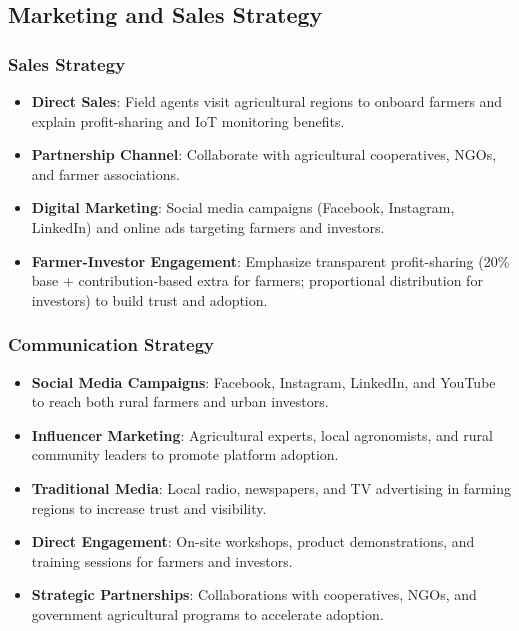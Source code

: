 \documentclass[9pt,twocolumn,twoside]{article}
\begin{document}
\subsection{Marketing and Sales Strategy}

\subsubsection{Sales Strategy}

\begin{itemize}
  \item \textbf{Direct Sales}: Field agents visit agricultural regions to onboard farmers and explain profit-sharing and IoT monitoring benefits.
  \item \textbf{Partnership Channel}: Collaborate with agricultural cooperatives, NGOs, and farmer associations.
  \item \textbf{Digital Marketing}: Social media campaigns (Facebook, Instagram, LinkedIn) and online ads targeting farmers and investors.
  \item \textbf{Farmer-Investor Engagement}: Emphasize transparent profit-sharing (20\% base + contribution-based extra for farmers; proportional distribution for investors) to build trust and adoption.
\end{itemize}

\subsubsection{Communication Strategy}

\begin{itemize}
  \item \textbf{Social Media Campaigns}: Facebook, Instagram, LinkedIn, and YouTube to reach both rural farmers and urban investors.
  \item \textbf{Influencer Marketing}: Agricultural experts, local agronomists, and rural community leaders to promote platform adoption.
  \item \textbf{Traditional Media}: Local radio, newspapers, and TV advertising in farming regions to increase trust and visibility.
  \item \textbf{Direct Engagement}: On-site workshops, product demonstrations, and training sessions for farmers and investors.
  \item \textbf{Strategic Partnerships}: Collaborations with cooperatives, NGOs, and government agricultural programs to accelerate adoption.
\end{itemize}
\end{document}
